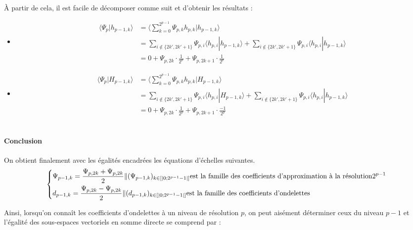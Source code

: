 \documentclass{article}
\begin{document}
\uppercase{à} partir de cela, il est facile de décomposer comme suit et d'obtenir les résultats :

\begin{itemize}
\item \begin{align*}\displaystyle \langle \Psi{}_{p}|h_{p-1,k}\rangle &=  \langle \sum_{k=0}^{2^{p-1}}\Psi{}_{p,k}h_{p,k}|h_{p-1,k}\rangle \\ &=  \sum_{i\notin{}\{2k',2k'+1\}}\Psi{}_{p,i}\langle{}h_{p,i}|h_{p-1,k}\rangle + \sum_{i\notin{}\{2k',2k'+1\}}\Psi{}_{p,i}\langle{}h_{p,i}|h_{p-1,k}\rangle  \\ 
&= 0 + \Psi{}_{p,2k}\cdot{}\frac{1}{2^p} + \Psi{}_{p,2k+1}\cdot{}\frac{1}{2^p} 
\end{align*} 

\item \begin{align*} \displaystyle \langle \Psi{}_{p}|H_{p-1,k}\rangle &= \langle \sum_{k=0}^{2^{p-1}}\Psi{}_{p,k}h_{p,k}|H_{p-1,k}\rangle \\ &= 
 \sum_{i\notin{}\{2k',2k'+1\}}\Psi{}_{p,i}\langle{}h_{p,i}|H_{p-1,k}\rangle + \sum_{i\notin{}\{2k',2k'+1\}}\Psi{}_{p,i}\langle{}h_{p,i}|h_{p-1,k}\rangle  \\ 
&= 0 + \Psi{}_{p,2k}\cdot{}\frac{1}{2^p} + \Psi{}_{p,2k+1}\cdot{}\frac{-1}{2^p}
\end{align*} \\


\end{itemize}

\paragraph{Conclusion}

On obtient finalement avec les égalités encadrées les équations d'échelles suivantes. \\

\[ \begin{dcases} \Psi{}_{p-1,k} = \frac{\Psi{}_{p,2k} + \Psi{}_{p,2k}}{2}  \| (\Psi{}_{p-1,k})_{k\in{}[|0;2^{p-1}-1|]} \text{est la famille des coefficients d'approximation à la résolution} 2^{p-1} \\ 
d_{p-1,k} = \frac{\Psi{}_{p,2k} - \Psi{}_{p,2k}}{2}  \| (d_{p-1,k})_{k\in{}[|0;2^{p-1}-1|]} \text{est la famille des coefficients d'ondelettes}
\end{dcases} \] 

Ainsi, lorsqu’on connaît les coefficients d’ondelettes à un niveau de résolution $p$, on peut aisément déterminer ceux du niveau $p-1$ et l’égalité des sous-espaces vectoriels en somme directe se comprend par :
\end{document}
